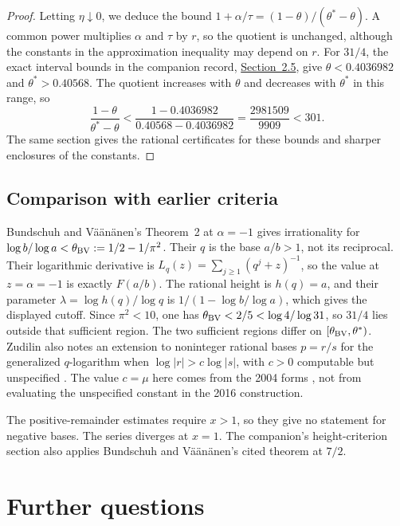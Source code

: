 \documentclass[11pt]{article}
\newcommand{\shortrecordlink}[3]{\href{#1\##2}{#3}}
\begin{document}
\begin{proof}
Letting $\eta\downarrow0$, we deduce the bound
$1+\alpha/\tau=(1-\theta)/(\theta^*-\theta)$. A common power multiplies
$\alpha$ and $\tau$ by $r$, so the quotient is unchanged, although the
constants in the approximation inequality may depend on $r$.
For $31/4$, the exact interval bounds in the companion record,
\shortrecordlink{erdos1049-rational-base-lambert-reasoning-surface.pdf}{long1049-regionbracket}{Section~2.5},
give $\theta<0.4036982$ and $\theta^*>0.40568$. The quotient increases
with $\theta$ and decreases with $\theta^*$ in this range, so
\[
 \frac{1-\theta}{\theta^*-\theta}
 <\frac{1-0.4036982}{0.40568-0.4036982}
 =\frac{2981509}{9909}<301.
\]
The same section gives the rational certificates for these bounds
and sharper enclosures of the constants.
\end{proof}

\subsection{Comparison with earlier criteria}
Bundschuh and V\"a\"an\"anen's Theorem~2 at $\alpha=-1$
\cite[p.~177]{bv1994} gives irrationality for
$\log b/\log a<\theta_{\rm BV}:=1/2-1/\pi^2$.
Their $q$ is the base $a/b>1$, not its reciprocal. Their logarithmic
derivative is $L_q(z)=\sum_{j\ge1}(q^j+z)^{-1}$, so the value at
$z=\alpha=-1$ is exactly $F(a/b)$. The rational height is $h(q)=a$,
and their parameter $\lambda=\log h(q)/\log q$ is
$1/(1-\log b/\log a)$, which gives the displayed cutoff.
Since $\pi^2<10$, one has $\theta_{\rm BV}<2/5<\log4/\log31$, so $31/4$ lies
outside that sufficient region.  The two sufficient regions differ on
$[\theta_{\rm BV},\theta^*)$.
Zudilin also notes an extension to noninteger rational bases $p=r/s$
for the generalized $q$-logarithm when $\log|r|>c\log|s|$, with $c>0$
computable but unspecified \cite[Sec.~2, p.~4]{zudilin2016}.
The value $c=\mu$ here comes from the 2004 forms
\cite[p.~162]{zudilin2004}, not from evaluating the unspecified
constant in the 2016 construction.

The positive-remainder estimates require $x>1$, so they give no
statement for negative bases. The series diverges at $x=1$.
The companion's height-criterion section also applies Bundschuh
and V\"a\"an\"anen's cited theorem at $7/2$.

\section{Further questions}\label{sec:open}
\end{document}
